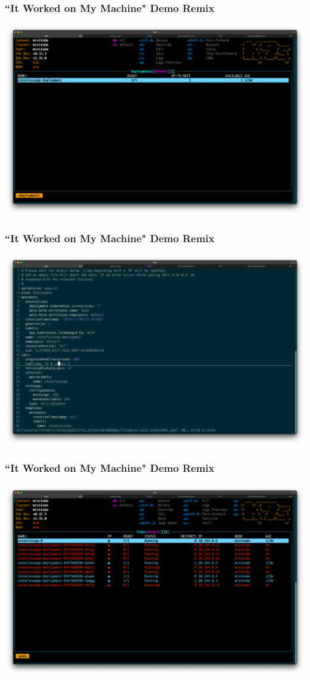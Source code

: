     \begin{frame}
        \frametitle{``It Worked on My Machine" Demo Remix}
        \includegraphics[width=\textwidth,height=0.85\textheight,keepaspectratio]{graphics/screenshots/01-deployment}
    \end{frame}

    \begin{frame}
        \frametitle{``It Worked on My Machine" Demo Remix}
        \includegraphics[width=\textwidth,height=0.85\textheight,keepaspectratio]{graphics/screenshots/02-scaleUp}
    \end{frame}

    \begin{frame}
        \frametitle{``It Worked on My Machine" Demo Remix}
        \includegraphics[width=\textwidth,height=0.85\textheight,keepaspectratio]{graphics/screenshots/03-converging}
    \end{frame}

